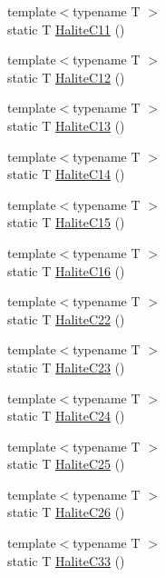 \begin{DoxyCompactItemize}
{\footnotesize template$<$typename T $>$ }\\static T \mbox{\hyperlink{namespacempc_1_1data_ae66ad610c3fb2d0d0d948ca491f5ac8b}{Halite\+C11}} ()
\item 
{\footnotesize template$<$typename T $>$ }\\static T \mbox{\hyperlink{namespacempc_1_1data_a5456d5bd2f802f924af06e711e7e13e3}{Halite\+C12}} ()
\item 
{\footnotesize template$<$typename T $>$ }\\static T \mbox{\hyperlink{namespacempc_1_1data_ae6173ed202200212d3aa15485299837b}{Halite\+C13}} ()
\item 
{\footnotesize template$<$typename T $>$ }\\static T \mbox{\hyperlink{namespacempc_1_1data_a07fd11aa126ea89998cb2b8986283a51}{Halite\+C14}} ()
\item 
{\footnotesize template$<$typename T $>$ }\\static T \mbox{\hyperlink{namespacempc_1_1data_a1ed7d73dd9340e67797f3811eebb01f0}{Halite\+C15}} ()
\item 
{\footnotesize template$<$typename T $>$ }\\static T \mbox{\hyperlink{namespacempc_1_1data_a508adaf4e516f9477af72152e7848299}{Halite\+C16}} ()
\item 
{\footnotesize template$<$typename T $>$ }\\static T \mbox{\hyperlink{namespacempc_1_1data_a56774b355f1755d9d0cca040a711f004}{Halite\+C22}} ()
\item 
{\footnotesize template$<$typename T $>$ }\\static T \mbox{\hyperlink{namespacempc_1_1data_aed645d521765807bc0aea1c79af99656}{Halite\+C23}} ()
\item 
{\footnotesize template$<$typename T $>$ }\\static T \mbox{\hyperlink{namespacempc_1_1data_aed16bb130fe01f384872ba7ab037d79a}{Halite\+C24}} ()
\item 
{\footnotesize template$<$typename T $>$ }\\static T \mbox{\hyperlink{namespacempc_1_1data_a1b54f6df69db2631d0a14e4f0b9b00fb}{Halite\+C25}} ()
\item 
{\footnotesize template$<$typename T $>$ }\\static T \mbox{\hyperlink{namespacempc_1_1data_a9ac276866ee96a28b9d546623a3d33a3}{Halite\+C26}} ()
\item 
{\footnotesize template$<$typename T $>$ }\\static T \mbox{\hyperlink{namespacempc_1_1data_a90eb6a9bf87fca1f5af924df1f3f5625}{Halite\+C33}} ()

\end{DoxyCompactItemize}

